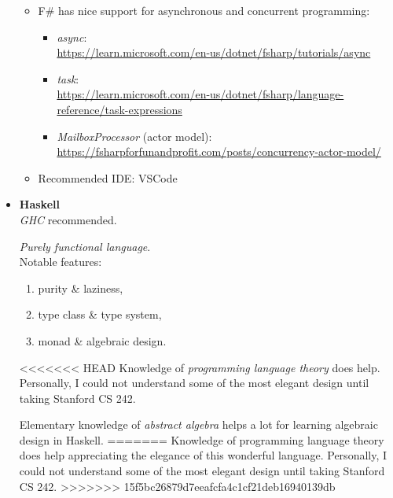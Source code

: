 \documentclass{article}
\begin{document}
\begin{itemize}
\begin{itemize}
\begin{enumerate}
        \end{enumerate}
        \item F\# has nice support for asynchronous and concurrent programming:
        \begin{itemize}
            \item \emph{async}:\\
            \href{https://learn.microsoft.com/en-us/dotnet/fsharp/tutorials/async}{https://learn.microsoft.com/en-us/dotnet/fsharp/tutorials/async}
            \item \emph{task}:\\
            \href{https://learn.microsoft.com/en-us/dotnet/fsharp/language-reference/task-expressions}{https://learn.microsoft.com/en-us/dotnet/fsharp/language-reference/task-expressions}
            \item \emph{MailboxProcessor} (actor model):\\
            \href{https://fsharpforfunandprofit.com/posts/concurrency-actor-model/}{https://fsharpforfunandprofit.com/posts/concurrency-actor-model/}
        \end{itemize}
        \item Recommended IDE: VSCode
    \end{itemize}

    \item \textbf{Haskell}\\
    \emph{GHC} recommended.
    
    \emph{Purely functional language}.\\

    Notable features:
    \begin{enumerate}
        \item purity \& laziness,
        \item type class \& type system,
        \item monad \& algebraic design.
    \end{enumerate}
    
<<<<<<< HEAD
    Knowledge of \emph{programming language theory} does help. Personally, I could not understand some of the most elegant design until taking Stanford CS 242.

    Elementary knowledge of \emph{abstract algebra} helps a lot for learning algebraic design in Haskell.
=======
    Knowledge of programming language theory does help appreciating the elegance of this wonderful language. Personally, I could not understand some of the most elegant design until taking Stanford CS 242.
>>>>>>> 15f5bc26879d7eeafcfa4c1cf21deb16940139db
    

\end{itemize}
\end{document}
